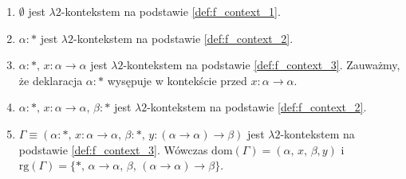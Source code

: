 \begin{przyklad}
  \begin{enumerate}[label=(\alph*), ref=(\alph*)]
    \setlength\itemsep{0em}
    \item \(\emptyset\) jest  \(\lambda 2\)-kontekstem na podstawie
      \ref{def:f_context_1}.\label{ex:f_context_a}
    \item \(\alpha:*\)  jest \(\lambda 2\)-kontekstem  na podstawie
\ref{def:f_context_2}.\label{ex:f_context_b}

    \item           \(\alpha:*,\,x:\alpha\to\alpha\)           jest
\(\lambda 2\)-kontekstem      na      podstawie      
\ref{def:f_context_3}.     Zauważmy,     że
deklaracja    \(\alpha:*\)    wysępuje   w    kontekście    przed
\(x:\alpha\to\alpha\).\label{ex:f_context_c}

    \item \(\alpha:*,\,x:\alpha\to\alpha,\,\beta:*\) jest \(\lambda 2\)-kontekstem na podstawie \ref{def:f_context_2}.\label{ex:f_context_d}

    \item \(\Gamma\equiv(\alpha:*,\,x:\alpha\to\alpha,\,\beta:*,\,y:(\alpha\to\alpha)\to\beta)\) jest \(\lambda 2\)-kontekstem na podstawie \ref{def:f_context_3}. Wówczas \(\mathrm{dom}(\Gamma)=(\alpha,\,x,\,\beta,y)\) i \(\mathrm{rg}(\Gamma)=\{*,\,\alpha\to\alpha,\, \beta,\,(\alpha\to\alpha)\to\beta\}\).\label{ex:f_context_e}
  \end{enumerate}
\end{przyklad}

